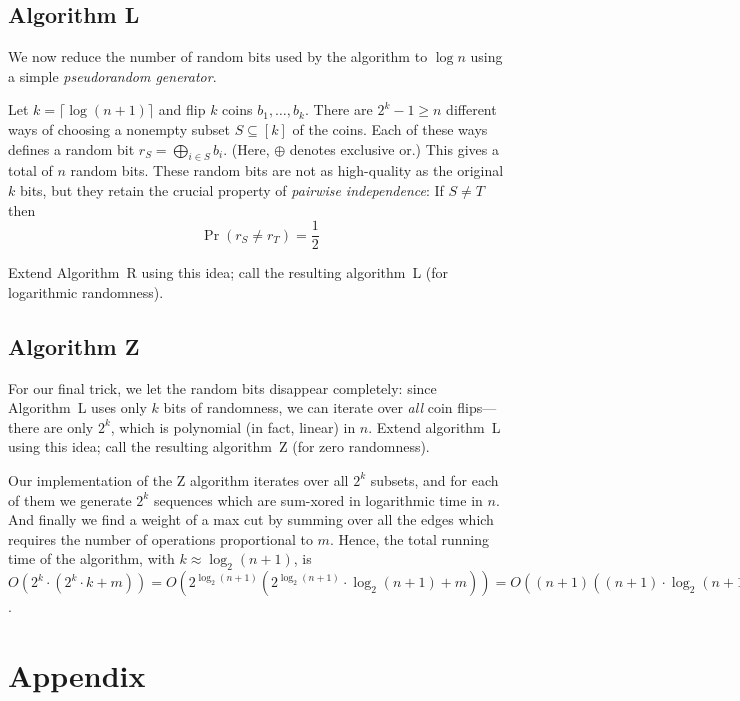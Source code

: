 \documentclass{tufte-handout}
\begin{document}
\subsection{Algorithm L} 


We now reduce the number of random bits used by the algorithm to $\log
n$ using a simple \emph{pseudorandom generator}.


Let $k=\lceil\log (n+1)\rceil$ and flip $k$ coins $b_1,\ldots, b_k$.
There are $2^k -1 \geq n$ different ways of choosing a nonempty subset
$S\subseteq [k]$ of the coins.
Each of these ways defines a random bit $r_S =\bigoplus_{i\in S} b_i$.
(Here, $\oplus$ denotes exclusive or.)
This gives a total of $n$ random bits.
These random bits are not as high-quality as the original $k$ bits,
but they retain the crucial property of \emph{pairwise independence}:
If $S\neq T$ then
\[ \Pr(r_S\neq r_T) = \frac1{2} \]

Extend Algorithm~R using this idea; call the resulting
algorithm~L (for logarithmic randomness).

\subsection{Algorithm Z}

For our final trick, we let the random bits disappear completely:
since Algorithm~L uses only $k$ bits of randomness, we can iterate
over \emph{all} coin flips---there are only $2^k$, which is polynomial
(in fact, linear) in $n$.
Extend algorithm~L using this idea; call the resulting algorithm~Z
(for zero randomness).


Our implementation of the Z algorithm iterates over all $2^k$ subsets, and for each of them we generate $2^k$ sequences which are sum-xored in logarithmic time in $n$. And finally we find a weight of a max cut by summing over all the edges which requires the number of operations proportional to $m$. Hence, the total running time of the algorithm, with $k\approx \log_2 (n+1)$, is $O(2^k \cdot (2^k\cdot k + m)) = O(2^{\log_2 (n+1)}(2^{\log_2 (n+1)}\cdot \log_2 (n+1) + m)) = O((n+1)((n+1)\cdot \log_2(n+1) + m))=O(n((n\cdot \log_2(n) + m))$.







\newpage
\section*{Appendix}
\appendix

\end{document}
